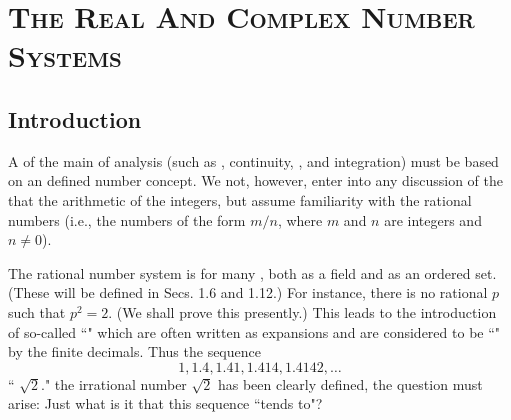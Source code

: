 \documentclass[
  leqno, 
  theme = Fresh Green,
  font = source-han,
  lang = en,
  usesamecnt
]{elegantbook-l3}
\newcounter{notemark}
\begin{document}
\maketitle[Skyrmion]

\frontmatter

\tableofcontents

\mainmatter
\linespread{1.6}\selectfont

\chapter{\textsc{The Real And Complex Number Systems}}
\section*{Introduction}
A  of the main  of analysis (such as , continuity, , and integration) must be based on an  defined number concept. We  not, however, enter into any discussion of the  that  the arithmetic of the integers, but assume familiarity with the rational numbers (i.e., the numbers of the form $m / n$, where $m$ and $n$ are integers and $n \neq 0$).

The rational number system is  for many , both as a field and as an ordered set. (These  will be defined in Secs. 1.6 and 1.12.) For instance, there is no rational $p$ such that $p^2=2$. (We shall prove this presently.) This leads to the introduction of so-called ``" which are often written as  expansions and are considered to be ``" by the  finite decimals. Thus the sequence
\[
  1,1.4,1.41,1.414,1.4142, \ldots
\]
`` $\sqrt{2}$."  the irrational number $\sqrt{2}$ has been clearly defined, the question must arise: Just what is it that this sequence ``tends to"?
\end{document}
